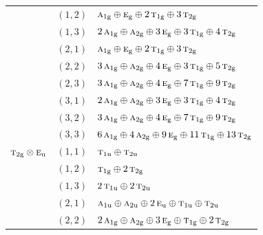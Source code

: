 \documentclass[11pt]{article}
\newcommand{\irr}[1]{\text{\normalfont\scshape #1}}
\newcommand{\ptag}[1]{\mathrm{#1}}
\begin{document}
\begin{longtable}{p{} c p{}}
 & $(1,2)$ & $\irr{a}_{1\ptag{g}}\oplus \irr{e}_{\ptag{g}}\oplus 2\,\irr{t}_{1\ptag{g}}\oplus 3\,\irr{t}_{2\ptag{g}}$\\

 & $(1,3)$ & $2\,\irr{a}_{1\ptag{g}}\oplus \irr{a}_{2\ptag{g}}\oplus 3\,\irr{e}_{\ptag{g}}\oplus 3\,\irr{t}_{1\ptag{g}}\oplus 4\,\irr{t}_{2\ptag{g}}$\\

 & $(2,1)$ & $\irr{a}_{1\ptag{g}}\oplus \irr{e}_{\ptag{g}}\oplus 2\,\irr{t}_{1\ptag{g}}\oplus 3\,\irr{t}_{2\ptag{g}}$\\

 & $(2,2)$ & $3\,\irr{a}_{1\ptag{g}}\oplus \irr{a}_{2\ptag{g}}\oplus 4\,\irr{e}_{\ptag{g}}\oplus 3\,\irr{t}_{1\ptag{g}}\oplus 5\,\irr{t}_{2\ptag{g}}$\\

 & $(2,3)$ & $3\,\irr{a}_{1\ptag{g}}\oplus \irr{a}_{2\ptag{g}}\oplus 4\,\irr{e}_{\ptag{g}}\oplus 7\,\irr{t}_{1\ptag{g}}\oplus 9\,\irr{t}_{2\ptag{g}}$\\

 & $(3,1)$ & $2\,\irr{a}_{1\ptag{g}}\oplus \irr{a}_{2\ptag{g}}\oplus 3\,\irr{e}_{\ptag{g}}\oplus 3\,\irr{t}_{1\ptag{g}}\oplus 4\,\irr{t}_{2\ptag{g}}$\\

 & $(3,2)$ & $3\,\irr{a}_{1\ptag{g}}\oplus \irr{a}_{2\ptag{g}}\oplus 4\,\irr{e}_{\ptag{g}}\oplus 7\,\irr{t}_{1\ptag{g}}\oplus 9\,\irr{t}_{2\ptag{g}}$\\

 & $(3,3)$ & $6\,\irr{a}_{1\ptag{g}}\oplus 4\,\irr{a}_{2\ptag{g}}\oplus 9\,\irr{e}_{\ptag{g}}\oplus 11\,\irr{t}_{1\ptag{g}}\oplus 13\,\irr{t}_{2\ptag{g}}$\\

\hline

$\irr{t}_{2\ptag{g}}\otimes \irr{e}_{\ptag{u}}$ & $(1,1)$ & $\irr{t}_{1\ptag{u}}\oplus \irr{t}_{2\ptag{u}}$\\

 & $(1,2)$ & $\irr{t}_{1\ptag{g}}\oplus 2\,\irr{t}_{2\ptag{g}}$\\

 & $(1,3)$ & $2\,\irr{t}_{1\ptag{u}}\oplus 2\,\irr{t}_{2\ptag{u}}$\\

 & $(2,1)$ & $\irr{a}_{1\ptag{u}}\oplus \irr{a}_{2\ptag{u}}\oplus 2\,\irr{e}_{\ptag{u}}\oplus \irr{t}_{1\ptag{u}}\oplus \irr{t}_{2\ptag{u}}$\\

 & $(2,2)$ & $2\,\irr{a}_{1\ptag{g}}\oplus \irr{a}_{2\ptag{g}}\oplus 3\,\irr{e}_{\ptag{g}}\oplus \irr{t}_{1\ptag{g}}\oplus 2\,\irr{t}_{2\ptag{g}}$\\


\end{longtable}
\end{document}
